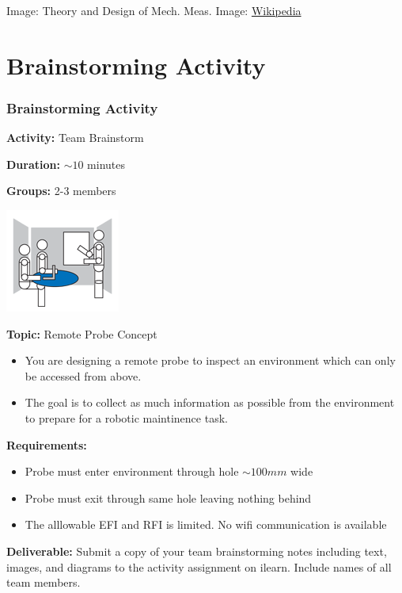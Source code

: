 \documentclass[fleqn]{beamer} %
\newcommand{\sectiontitleIV}{Brainstorming Activity}
\begin{document}
\begin{frame}
{\tiny Image: Theory and Design of Mech. Meas. \hspace{20mm} Image: \href{https://en.wikipedia.org/wiki/Thermocouple}{Wikipedia} }
\end{frame}

\section{\sectiontitleIV}

	\begin{frame}[label=sectionIV]
	\frametitle{\sectiontitleIV}

		\scriptsize
		\begin{multicols}{2}
			{\bf Activity:} Team Brainstorm

			{\bf Duration:} $\sim 10$ minutes

			{\bf Groups:} 2-3 members

			\includegraphics[scale=0.5]{Brainstorm_room.png}

			{\bf Topic:} Remote Probe Concept
			\begin{itemize}
				\item You are designing a remote probe to inspect an environment which can only be accessed from above. 
				\item The goal is to collect as much information as possible from the environment to prepare for a robotic maintinence task. 
	        \end{itemize}

	    \end{multicols}	

	    {\bf Requirements:}	
		\begin{itemize}
			\item Probe must enter environment through hole $\sim 100mm$ wide 
			\item Probe must exit through same hole leaving nothing behind
			\item The alllowable EFI and RFI is limited. No wifi communication is available \vspace{4mm}
		\end{itemize}

		{\bf Deliverable:} Submit a copy of your team brainstorming notes including text, images, and diagrams to the activity assignment on ilearn. Include names of all team members.

	\end{frame}
\end{document}
